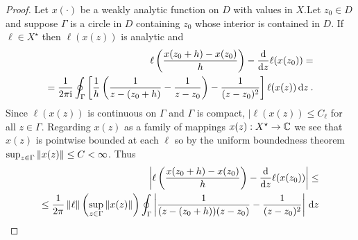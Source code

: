 \begin{proof}
    Let $x(\cdot)$ be a weakly analytic function on $D$ with values in $X$.Let $z_0 \in D$ and suppose $\Gamma$ is a circle in $D$ containing $z_0$ whose interior is contained in $D$. If $\ell \in X^\star$ then $\ell(x(z))$ is analytic and
    \begin{align}
        \ell \left( \frac{x(z_0+h)-x(z_0)}{h}\right) - \frac{\mathrm{d}}{\mathrm{d}z} \ell(x(z_0)) = \\
        = \frac{1}{2 \pi \mathrm{i}} \oint_\Gamma \left[ \frac{1}{h} \left( \frac{1}{z-(z_0+h)} - \frac{1}{z-z_0} \right) - \frac{1}{(z-z_0)^2} \right] \ell (x(z)) \, \mathrm{d} z \:.
    \end{align}
    Since $\ell(x(z))$ is continuous on $\Gamma$ and $\Gamma$ is compact, $|\ell(x(z)) \leq C_\ell$ for all $z \in \Gamma$. Regarding $x(z)$ as a family of mappings $x(z) : X^\star \to \mathbb{C}$ we see that $x(z)$ is pointwise bounded at each $\ell$ so by the uniform boundedness theorem $\sup_{z \in \Gamma} \left \Vert x(z) \right \Vert \leq C < \infty$. Thus \begin{align}
        \left| \ell \left( \frac{x(z_0+h)-x(z_0)}{h}\right) - \frac{\mathrm{d}}{\mathrm{d}z} \ell(x(z_0)) \right| \leq \\
        \leq \frac{1}{2 \pi} \left \Vert \ell \right \Vert \left( \sup_{z \in \Gamma} \left \Vert x(z) \right \Vert \right) \oint_\Gamma \left| \frac{1}{(z-(z_0+h))(z-z_0)} - \frac{1}{(z-z_0)^2}\right| \, \mathrm{d} z
    \end{align}

\end{proof}